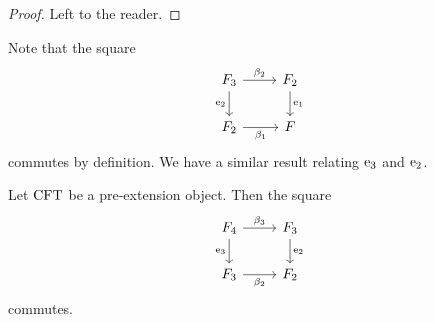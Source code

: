 \begin{proof}
Left to the reader.
\end{proof}

\begin{comment}
\begin{proof}
It is straightforward to verify the equalities
\begin{align*}
\pullbackpr{1}{\ectxext}{\eft}\circ\beta_2\circ
  (\pullback{\pullbackpr{2}{\efamext}{\eft[1]}}{\pullbackpr{2}{\efamext}{\eft[1]}}{\efamext}{\eft[1]})
  & =
\pullbackpr{1}{\ectxext}{\eft}\circ\beta_2\circ\beta_3
  \\
\pullbackpr{2}{\ectxext}{\eft}\circ\beta_2\circ
  (\pullback{\pullbackpr{2}{\efamext}{\eft[1]}}{\pullbackpr{2}{\efamext}{\eft[1]}}{\efamext}{\eft[1]})
  & =
\pullbackpr{2}{\ectxext}{\eft}\circ\beta_2\circ\beta_3.\qedhere
\end{align*}
\end{proof}
\end{comment}

Note that the square
\begin{equation*}
\begin{tikzcd}
\stesysf_3
  \ar{r}{\beta_2}
  \ar{d}[swap]{\eext{2}}
  &
\stesysf_2
  \ar{d}{\efamext}
  \\
\stesysf_2
  \ar{r}[swap]{\beta_1}
  &
\stesysf
\end{tikzcd}
\end{equation*}
commutes by definition. We have a similar result relating $\mathrm{e}_{3}$ and
$\mathrm{e}_{2}$.

\begin{lem}
Let $\mathrm{CFT}$ be a pre-extension object. Then the square
\begin{equation*}
\begin{tikzcd}
\stesysf_4
  \ar{r}{\beta_3}
  \ar{d}[swap]{\eext{3}}
  &
\stesysf_3
  \ar{d}{\eext{2}}
  \\
\stesysf_3
  \ar{r}[swap]{\beta_2}
  &
\stesysf_2
\end{tikzcd}
\end{equation*}
commutes.
\end{lem}

